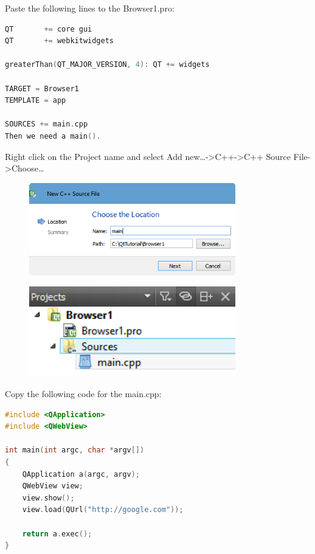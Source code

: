 Paste the following lines to the Browser1.pro:

\begin{lstlisting}[language=c++]
QT       += core gui
QT       += webkitwidgets

greaterThan(QT_MAJOR_VERSION, 4): QT += widgets

TARGET = Browser1
TEMPLATE = app

SOURCES += main.cpp
Then we need a main().
\end{lstlisting}

Right click on the Project name and select Add
new\ldots{}-\textgreater{}C++-\textgreater{}C++ Source
File-\textgreater{}Choose\ldots{}

\begin{figure}[htbp]
\centering
\includegraphics[width=0.8\textwidth]{images/main_cpp.png}
\caption{}
\end{figure}

\begin{figure}[htbp]
\centering
\includegraphics[width=0.8\textwidth]{images/Browser1_files.png}
\caption{}
\end{figure}

Copy the following code for the main.cpp:

\begin{lstlisting}[language=c++]
#include <QApplication>
#include <QWebView>

int main(int argc, char *argv[])
{
    QApplication a(argc, argv);
    QWebView view;
    view.show();
    view.load(QUrl("http://google.com"));

    return a.exec();
}
\end{lstlisting}

